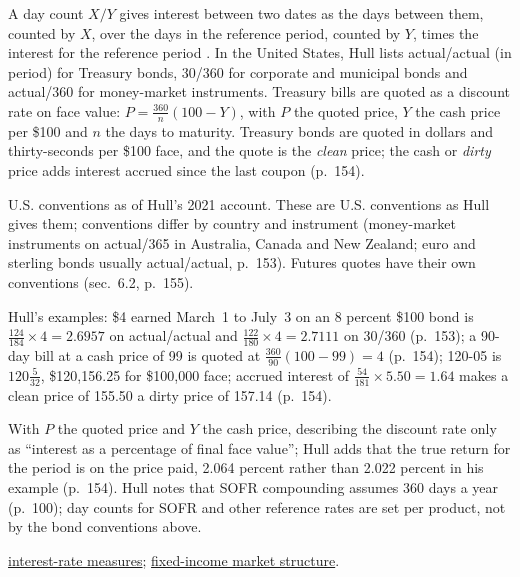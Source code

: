 \begin{qfconvention}\label{conv:us-rate-quotation}
 A day count $X/Y$ gives interest between two dates as the days between them, counted by $X$, over the days in the reference period, counted by $Y$, times the interest for the reference period \citep[chap.~6, ``Interest Rate Futures'', sec.~6.1, pp.~152--153]{s7-hulloptions}. In the United States, Hull lists actual/actual (in period) for Treasury bonds, 30/360 for corporate and municipal bonds and actual/360 for money-market instruments. Treasury bills are quoted as a discount rate on face value: $P=\frac{360}{n}(100-Y)$, with $P$ the quoted price, $Y$ the cash price per \$100 and $n$ the days to maturity. Treasury bonds are quoted in dollars and thirty-seconds per \$100 face, and the quote is the \emph{clean} price; the cash or \emph{dirty} price adds interest accrued since the last coupon (p.~154).

 U.S. conventions as of Hull's 2021 account. These are U.S. conventions as Hull gives them; conventions differ by country and instrument (money-market instruments on actual/365 in Australia, Canada and New Zealand; euro and sterling bonds usually actual/actual, p.~153). Futures quotes have their own conventions (sec.~6.2, p.~155).

 Hull's examples: \$4 earned March~1 to July~3 on an 8 percent \$100 bond is $\frac{124}{184}\times4=2.6957$ on actual/actual and $\frac{122}{180}\times4=2.7111$ on 30/360 (p.~153); a 90-day bill at a cash price of 99 is quoted at $\frac{360}{90}(100-99)=4$ (p.~154); 120-05 is $120\tfrac{5}{32}$, \$120{,}156.25 for \$100{,}000 face; accrued interest of $\frac{54}{181}\times5.50=1.64$ makes a clean price of 155.50 a dirty price of 157.14 (p.~154).

 With $P$ the quoted price and $Y$ the cash price, describing the discount rate only as ``interest as a percentage of final face value''; Hull adds that the true return for the period is on the price paid, 2.064 percent rather than 2.022 percent in his example (p.~154). Hull notes that SOFR compounding assumes 360 days a year (p.~100); day counts for SOFR and other reference rates are set per product, not by the bond conventions above.

 \hyperref[def:interest-rate-measures]{interest-rate measures}; \hyperref[def:fixed-income-market-structure]{fixed-income market structure}.

\end{qfconvention}
